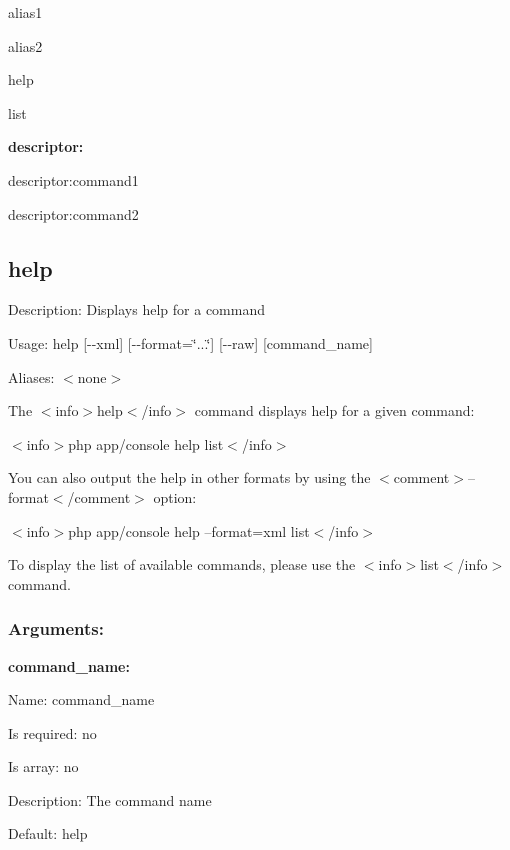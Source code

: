 
\begin{DoxyItemize}
\item alias1
\item alias2
\item help
\item list
\end{DoxyItemize}

{\bfseries descriptor\+:}


\begin{DoxyItemize}
\item descriptor\+:command1
\item descriptor\+:command2
\end{DoxyItemize}

\subsection*{help }


\begin{DoxyItemize}
\item Description\+: Displays help for a command
\item Usage\+: {\ttfamily help [-\/-\/xml] [-\/-\/format=\char`\"{}...\char`\"{}] [-\/-\/raw] [command\+\_\+name]}
\item Aliases\+: $<$none$>$
\end{DoxyItemize}

The $<$info$>$help$<$/info$>$ command displays help for a given command\+:

$<$info$>$php app/console help list$<$/info$>$

You can also output the help in other formats by using the $<$comment$>$--format$<$/comment$>$ option\+:

$<$info$>$php app/console help --format=xml list$<$/info$>$

To display the list of available commands, please use the $<$info$>$list$<$/info$>$ command.

\subsubsection*{Arguments\+:}

{\bfseries command\+\_\+name\+:}


\begin{DoxyItemize}
\item Name\+: command\+\_\+name
\item Is required\+: no
\item Is array\+: no
\item Description\+: The command name
\item Default\+: {\ttfamily \textquotesingle{}help\textquotesingle{}}
\end{DoxyItemize}

